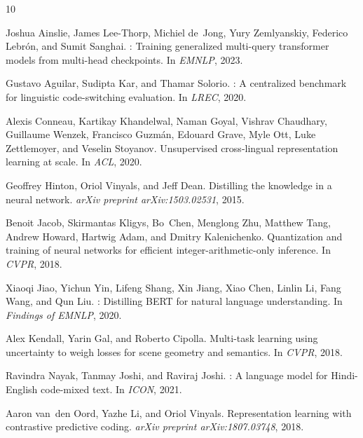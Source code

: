 \documentclass[11pt,a4paper]{article}
\begin{document}

\begin{thebibliography}{10}

Joshua Ainslie, James Lee-Thorp, Michiel de~Jong, Yury Zemlyanskiy, Federico
  Lebr{\'o}n, and Sumit Sanghai.
: Training generalized multi-query transformer models from
  multi-head checkpoints.
\newblock In \emph{EMNLP}, 2023.

Gustavo Aguilar, Sudipta Kar, and Thamar Solorio.
: A centralized benchmark for linguistic code-switching
  evaluation.
\newblock In \emph{LREC}, 2020.

Alexis Conneau, Kartikay Khandelwal, Naman Goyal, Vishrav Chaudhary, Guillaume
  Wenzek, Francisco Guzm{\'a}n, Edouard Grave, Myle Ott, Luke Zettlemoyer, and
  Veselin Stoyanov.
\newblock Unsupervised cross-lingual representation learning at scale.
\newblock In \emph{ACL}, 2020.

Geoffrey Hinton, Oriol Vinyals, and Jeff Dean.
\newblock Distilling the knowledge in a neural network.
\newblock \emph{arXiv preprint arXiv:1503.02531}, 2015.

Benoit Jacob, Skirmantas Kligys, Bo~Chen, Menglong Zhu, Matthew Tang, Andrew
  Howard, Hartwig Adam, and Dmitry Kalenichenko.
\newblock Quantization and training of neural networks for efficient
  integer-arithmetic-only inference.
\newblock In \emph{CVPR}, 2018.

Xiaoqi Jiao, Yichun Yin, Lifeng Shang, Xin Jiang, Xiao Chen, Linlin Li, Fang
  Wang, and Qun Liu.
: Distilling {BERT} for natural language understanding.
\newblock In \emph{Findings of EMNLP}, 2020.

Alex Kendall, Yarin Gal, and Roberto Cipolla.
\newblock Multi-task learning using uncertainty to weigh losses for scene
  geometry and semantics.
\newblock In \emph{CVPR}, 2018.

Ravindra Nayak, Tanmay Joshi, and Raviraj Joshi.
: A language model for {Hindi-English}
  code-mixed text.
\newblock In \emph{ICON}, 2021.

Aaron van~den Oord, Yazhe Li, and Oriol Vinyals.
\newblock Representation learning with contrastive predictive coding.
\newblock \emph{arXiv preprint arXiv:1807.03748}, 2018.


\end{thebibliography}
\end{document}
